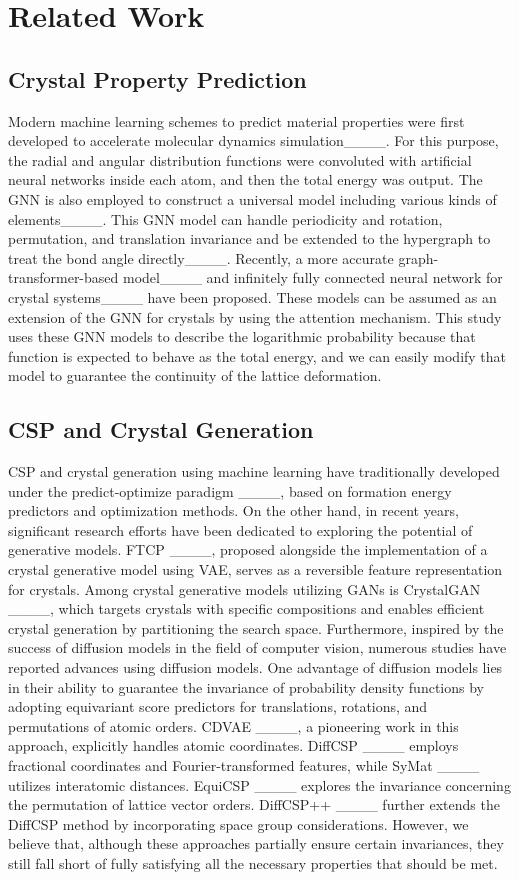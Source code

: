 \section{Related Work}
\subsection{Crystal Property Prediction}
Modern machine learning schemes to predict material properties were first developed to accelerate molecular dynamics simulation____.
For this purpose, the radial and angular distribution functions were convoluted with artificial neural networks inside each atom, and then the total energy was output.
The GNN is also employed to construct a universal model including various kinds of elements____.
This GNN model can handle periodicity and rotation, permutation, and translation invariance and be extended to the hypergraph to treat the bond angle directly____.
Recently, a more accurate graph-transformer-based model____ and infinitely fully connected neural network for crystal systems____ have been proposed.
These models can be assumed as an extension of the GNN for crystals by using the attention mechanism.
This study uses these GNN models to describe the logarithmic probability because that function is expected to behave as the total energy, and we can easily modify that model to guarantee the continuity of the lattice deformation.

\subsection{CSP and Crystal Generation}
CSP and crystal generation using machine learning have traditionally developed under the predict-optimize paradigm ____, based on formation energy predictors and optimization methods. On the other hand, in recent years, significant research efforts have been dedicated to exploring the potential of generative models. FTCP ____, proposed alongside the implementation of a crystal generative model using VAE, serves as a reversible feature representation for crystals. Among crystal generative models utilizing GANs is CrystalGAN ____, which targets crystals with specific compositions and enables efficient crystal generation by partitioning the search space. Furthermore, inspired by the success of diffusion models in the field of computer vision, numerous studies have reported advances using diffusion models. One advantage of diffusion models lies in their ability to guarantee the invariance of probability density functions by adopting equivariant score predictors for translations, rotations, and permutations of atomic orders. CDVAE ____, a pioneering work in this approach, explicitly handles atomic coordinates. DiffCSP ____ employs fractional coordinates and Fourier-transformed features, while SyMat ____ utilizes interatomic distances. EquiCSP ____ explores the invariance concerning the permutation of lattice vector orders. DiffCSP++ ____ further extends the DiffCSP method by incorporating space group considerations. However, we believe that, although these approaches partially ensure certain invariances, they still fall short of fully satisfying all the necessary properties that should be met.


